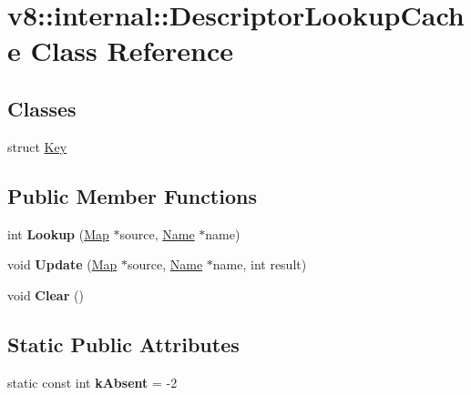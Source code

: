 \hypertarget{classv8_1_1internal_1_1_descriptor_lookup_cache}{}\section{v8\+:\+:internal\+:\+:Descriptor\+Lookup\+Cache Class Reference}
\label{classv8_1_1internal_1_1_descriptor_lookup_cache}
\subsection*{Classes}
\begin{DoxyCompactItemize}
\item 
struct \hyperlink{structv8_1_1internal_1_1_descriptor_lookup_cache_1_1_key}{Key}
\end{DoxyCompactItemize}
\subsection*{Public Member Functions}
\begin{DoxyCompactItemize}
\item 
int {\bfseries Lookup} (\hyperlink{classv8_1_1internal_1_1_map}{Map} $\ast$source, \hyperlink{classv8_1_1internal_1_1_name}{Name} $\ast$name)\hypertarget{classv8_1_1internal_1_1_descriptor_lookup_cache_a6d08c94fdb4f1ea5f23f870e9e6805dd}{}\label{classv8_1_1internal_1_1_descriptor_lookup_cache_a6d08c94fdb4f1ea5f23f870e9e6805dd}

\item 
void {\bfseries Update} (\hyperlink{classv8_1_1internal_1_1_map}{Map} $\ast$source, \hyperlink{classv8_1_1internal_1_1_name}{Name} $\ast$name, int result)\hypertarget{classv8_1_1internal_1_1_descriptor_lookup_cache_a84a1bd8630104556e4548621e7f252c6}{}\label{classv8_1_1internal_1_1_descriptor_lookup_cache_a84a1bd8630104556e4548621e7f252c6}

\item 
void {\bfseries Clear} ()\hypertarget{classv8_1_1internal_1_1_descriptor_lookup_cache_a00f0f0d03b3c4698ae2b5b4ce23d92d4}{}\label{classv8_1_1internal_1_1_descriptor_lookup_cache_a00f0f0d03b3c4698ae2b5b4ce23d92d4}

\end{DoxyCompactItemize}
\subsection*{Static Public Attributes}
\begin{DoxyCompactItemize}
\item 
static const int {\bfseries k\+Absent} = -\/2\hypertarget{classv8_1_1internal_1_1_descriptor_lookup_cache_a5c88488d5dfd0cb4d26b07dc96ceaf60}{}\label{classv8_1_1internal_1_1_descriptor_lookup_cache_a5c88488d5dfd0cb4d26b07dc96ceaf60}

\end{DoxyCompactItemize}
